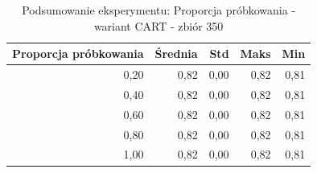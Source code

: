 \begin{table}[htbp]
\centering
\small
\setlength{\tabcolsep}{6pt}
\renewcommand{\arraystretch}{1.2}
\caption{Podsumowanie eksperymentu: Proporcja próbkowania - wariant CART - zbiór 350}
\label{tab:CART_sample_ratio_350}
\begin{tabular}{r|r|r|r|r}
\toprule
Proporcja próbkowania & Średnia & Std & Maks & Min \\
\hline
0,20 & 0,82 & 0,00 & 0,82 & 0,81 \\
0,40 & 0,82 & 0,00 & 0,82 & 0,81 \\
0,60 & 0,82 & 0,00 & 0,82 & 0,81 \\
0,80 & 0,82 & 0,00 & 0,82 & 0,81 \\
1,00 & 0,82 & 0,00 & 0,82 & 0,81 \\
\bottomrule
\end{tabular}
\end{table}